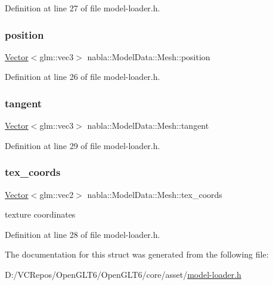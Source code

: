 Definition at line 27 of file model-\/loader.\+h.

\mbox{\label{structnabla_1_1_model_data_1_1_mesh_aee38e2512ccdf3b19d764ce5cb9722dc}} 
\subsubsection{\texorpdfstring{position}{position}}
{\footnotesize\ttfamily \mbox{\hyperlink{namespacenabla_a34f7ca8c9af290f9af3ed299236ff959}{Vector}}$<$glm\+::vec3$>$ nabla\+::\+Model\+Data\+::\+Mesh\+::position}



Definition at line 26 of file model-\/loader.\+h.

\mbox{\label{structnabla_1_1_model_data_1_1_mesh_a4d7c587c73e9cc567b039a7be53972e2}} 
\subsubsection{\texorpdfstring{tangent}{tangent}}
{\footnotesize\ttfamily \mbox{\hyperlink{namespacenabla_a34f7ca8c9af290f9af3ed299236ff959}{Vector}}$<$glm\+::vec3$>$ nabla\+::\+Model\+Data\+::\+Mesh\+::tangent}



Definition at line 29 of file model-\/loader.\+h.

\mbox{\label{structnabla_1_1_model_data_1_1_mesh_ac2e9894e06bb2bd2306615954c7dcdbe}} 
\subsubsection{\texorpdfstring{tex\_coords}{tex\_coords}}
{\footnotesize\ttfamily \mbox{\hyperlink{namespacenabla_a34f7ca8c9af290f9af3ed299236ff959}{Vector}}$<$glm\+::vec2$>$ nabla\+::\+Model\+Data\+::\+Mesh\+::tex\+\_\+coords}

texture coordinates 

Definition at line 28 of file model-\/loader.\+h.



The documentation for this struct was generated from the following file\+:\begin{DoxyCompactItemize}
\item 
D\+:/\+V\+C\+Repos/\+Open\+G\+L\+T6/\+Open\+G\+L\+T6/core/asset/\mbox{\hyperlink{model-loader_8h}{model-\/loader.\+h}}\end{DoxyCompactItemize}
